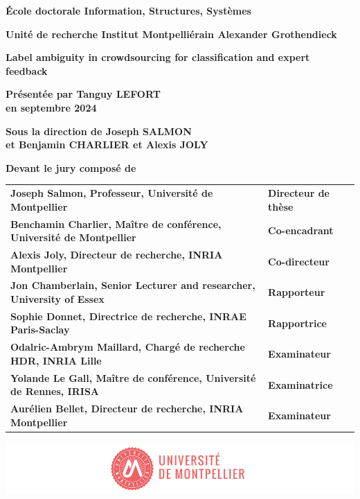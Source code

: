 \documentclass[
a4paper, %
12pt]{book}
\begin{document}
\begin{titlepage}
{\bigskip
\textbf{École doctorale Information, Structures, Systèmes}

\bigskip
\textbf{Unité de recherche Institut Montpelliérain Alexander Grothendieck}


\color{Titleblue}
\fontsize{17}{20.4}\selectfont
\vspace{2cm}
\textbf{Label ambiguity in crowdsourcing for classification and
expert feedback}


\vspace{4cm}
\fontsize{15}{18}\selectfont
\color{black}
\textbf{Présentée par Tanguy LEFORT\\
en septembre 2024}

\bigskip
\fontsize{13}{15.6}\selectfont
\textbf{Sous la direction de Joseph SALMON\\
et Benjamin CHARLIER et Alexis JOLY}

\vspace{1.5cm}
\normalsize
\textbf{Devant le jury composé de}\\
\bigskip
\fontsize{10}{12}\selectfont
\vspace{1.5mm}
\begin{tabular}{p{14cm}l}
\textbf{Joseph Salmon, Professeur, Université de Montpellier} & \textbf{Directeur de thèse} \\
\textbf{Benchamin Charlier, Maître de conférence, Université de Montpellier} & \textbf{Co-encadrant} \\
\textbf{Alexis Joly, Directeur de recherche, INRIA Montpellier} & \textbf{Co-directeur} \\
\textbf{Jon Chamberlain, Senior Lecturer and researcher, University of Essex} & \textbf{Rapporteur} \\
\textbf{Sophie Donnet, Directrice de recherche, INRAE Paris-Saclay} & \textbf{Rapportrice} \\
\textbf{Odalric-Ambrym Maillard, Chargé de recherche HDR, INRIA Lille} & \textbf{Examinateur} \\
\textbf{Yolande Le Gall, Maître de conférence, Université de Rennes, IRISA} & \textbf{Examinatrice} \\
\textbf{Aurélien Bellet, Directeur de recherche, INRIA Montpellier} & \textbf{Examinateur} \\

\end{tabular}

\vspace{\fill}
\includegraphics[scale=1]{images/PhD_Couverture_LogoUM.png}
\vspace{-15mm}}
\end{titlepage}


% 
\end{document}
